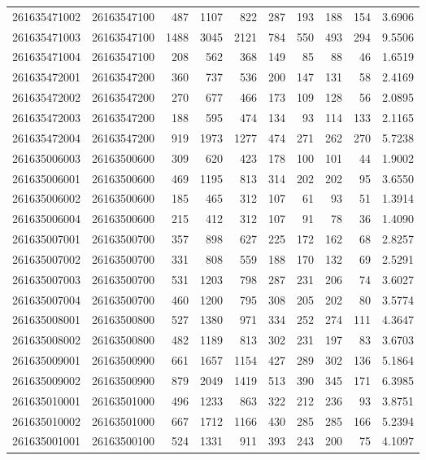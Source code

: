 \documentclass[
  11pt,
]{article}
\begin{document}
\begin{longtable}[t]{llrrrrrrrr}
261635471002 & 26163547100 & 487 & 1107 & 822 & 287 & 193 & 188 & 154 & 3.6906\\
261635471003 & 26163547100 & 1488 & 3045 & 2121 & 784 & 550 & 493 & 294 & 9.5506\\
261635471004 & 26163547100 & 208 & 562 & 368 & 149 & 85 & 88 & 46 & 1.6519\\
261635472001 & 26163547200 & 360 & 737 & 536 & 200 & 147 & 131 & 58 & 2.4169\\
261635472002 & 26163547200 & 270 & 677 & 466 & 173 & 109 & 128 & 56 & 2.0895\\
261635472003 & 26163547200 & 188 & 595 & 474 & 134 & 93 & 114 & 133 & 2.1165\\
261635472004 & 26163547200 & 919 & 1973 & 1277 & 474 & 271 & 262 & 270 & 5.7238\\
261635006003 & 26163500600 & 309 & 620 & 423 & 178 & 100 & 101 & 44 & 1.9002\\
261635006001 & 26163500600 & 469 & 1195 & 813 & 314 & 202 & 202 & 95 & 3.6550\\
261635006002 & 26163500600 & 185 & 465 & 312 & 107 & 61 & 93 & 51 & 1.3914\\
261635006004 & 26163500600 & 215 & 412 & 312 & 107 & 91 & 78 & 36 & 1.4090\\
261635007001 & 26163500700 & 357 & 898 & 627 & 225 & 172 & 162 & 68 & 2.8257\\
261635007002 & 26163500700 & 331 & 808 & 559 & 188 & 170 & 132 & 69 & 2.5291\\
261635007003 & 26163500700 & 531 & 1203 & 798 & 287 & 231 & 206 & 74 & 3.6027\\
261635007004 & 26163500700 & 460 & 1200 & 795 & 308 & 205 & 202 & 80 & 3.5774\\
261635008001 & 26163500800 & 527 & 1380 & 971 & 334 & 252 & 274 & 111 & 4.3647\\
261635008002 & 26163500800 & 482 & 1189 & 813 & 302 & 231 & 197 & 83 & 3.6703\\
261635009001 & 26163500900 & 661 & 1657 & 1154 & 427 & 289 & 302 & 136 & 5.1864\\
261635009002 & 26163500900 & 879 & 2049 & 1419 & 513 & 390 & 345 & 171 & 6.3985\\
261635010001 & 26163501000 & 496 & 1233 & 863 & 322 & 212 & 236 & 93 & 3.8751\\
261635010002 & 26163501000 & 667 & 1712 & 1166 & 430 & 285 & 285 & 166 & 5.2394\\
261635001001 & 26163500100 & 524 & 1331 & 911 & 393 & 243 & 200 & 75 & 4.1097\\

\end{longtable}
\end{document}
